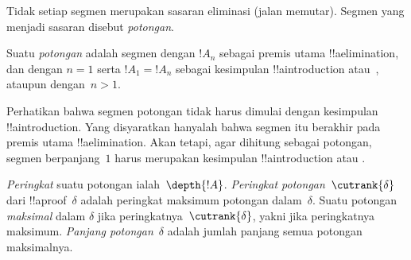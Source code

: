 \documentclass[../../../include/open-logic-section]{subfiles}
\begin{document}
Tidak setiap segmen merupakan sasaran eliminasi (jalan memutar). Segmen yang
menjadi sasaran disebut \emph{potongan}.

\begin{defn}
Suatu \emph{potongan} adalah segmen dengan $!A_n$ sebagai premis utama
!!a{elimination}, dan dengan $n=1$ serta $!A_1 = !A_n$ sebagai kesimpulan
!!a{introduction} atau~\FalseInt, ataupun dengan~$n>1$.
\end{defn}

Perhatikan bahwa segmen potongan tidak harus dimulai dengan kesimpulan
!!a{introduction}. Yang disyaratkan hanyalah bahwa segmen itu berakhir pada
premis utama !!a{elimination}. Akan tetapi, agar dihitung sebagai potongan,
segmen berpanjang~$1$ harus merupakan kesimpulan !!a{introduction} atau
\FalseInt.

\begin{defn}
\emph{Peringkat} suatu potongan ialah~$\depth{!A}$. \emph{Peringkat
potongan}~$\cutrank{\delta}$ dari !!a{proof}~$\delta$ adalah peringkat
maksimum potongan dalam~$\delta$. Suatu potongan \emph{maksimal} dalam
$\delta$ jika peringkatnya~$\cutrank{\delta}$, yakni jika peringkatnya
maksimum. \emph{Panjang potongan}~$\delta$ adalah jumlah panjang semua
potongan maksimalnya.
\end{defn}
\end{document}

